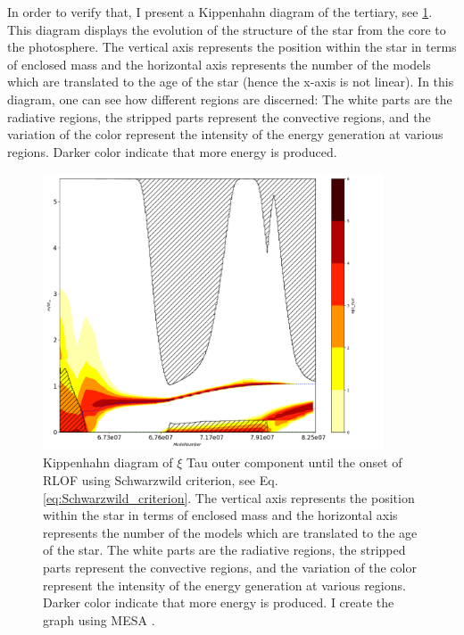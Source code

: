 In order to verify that, I present a Kippenhahn diagram of the tertiary, see \cref{fig:kippen_plot}. This diagram displays the evolution of the structure of the star from the core to the photosphere. The vertical axis represents the position within the star in terms of enclosed mass and the horizontal axis represents the number of the models which are translated to the age of the star (hence the x-axis is not linear). In this diagram, one can see how different regions are discerned: The white parts are the radiative regions, the stripped parts represent the convective regions, and the variation of the color represent the
intensity of the energy generation at various regions. Darker color indicate that more energy is produced.
\begin{figure}[H]
    \centering
    \includegraphics[width=0.9\textwidth]{Thesis/graphs/jpg2pdf.pdf}
    \caption{Kippenhahn diagram of $\xi$ Tau outer component until the onset of RLOF using Schwarzwild criterion, see Eq. \eqref{eq:Schwarzwild_criterion}. The vertical axis represents the position within the star in terms of enclosed mass and the horizontal axis represents the number of the models which are translated to the age of the star. The white parts are the radiative regions, the stripped parts represent the convective regions, and the variation of the color represent the intensity of the energy generation at various regions. Darker color indicate that more energy is produced. I create the graph using MESA \citep{paxton2010modules,paxton2013modules,paxton2015modules,paxton2019modules}.}
    \label{fig:kippen_plot}
\end{figure}

